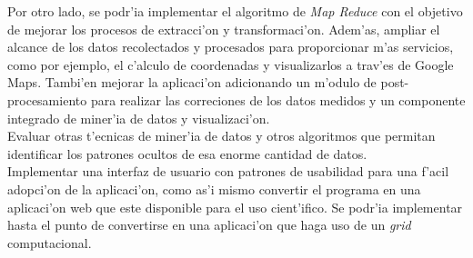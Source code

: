 Por otro lado, se podr'ia implementar el algoritmo de \emph{Map Reduce} con el objetivo de mejorar los procesos de extracci'on y transformaci'on. Adem'as, ampliar el alcance de los datos recolectados y procesados para proporcionar m'as servicios, como por ejemplo, el c'alculo de coordenadas y visualizarlos a trav'es de Google Maps. Tambi'en mejorar la aplicaci'on adicionando un m'odulo de post-procesamiento para realizar las correciones de los datos medidos y un componente integrado de miner'ia de datos y visualizaci'on.\\

Evaluar otras t'ecnicas de miner'ia de datos y otros algoritmos que permitan identificar los patrones ocultos de esa enorme cantidad de datos.\\

Implementar una interfaz de usuario con patrones de usabilidad para una f'acil adopci'on de la aplicaci'on, como as'i mismo convertir el programa en una aplicaci'on web que este disponible para el uso cient'ifico. Se podr'ia implementar hasta el punto de convertirse en una aplicaci'on que haga uso de un \emph{grid} computacional.\\



\clearpage
